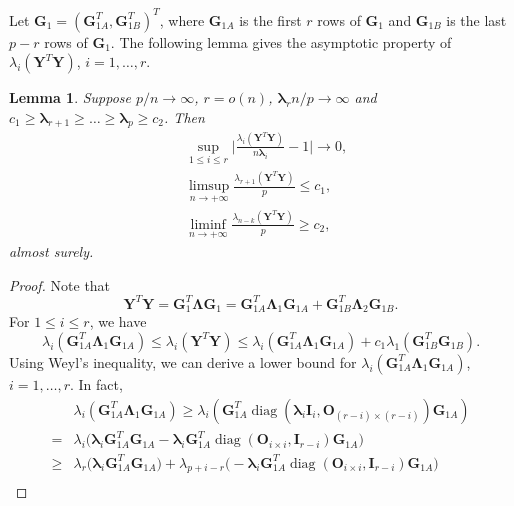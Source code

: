 \documentclass[12pt]{article} %
\DeclareMathOperator{\mydiag}{diag}
\newcommand{\bA}{\mathbf{A}}
\newcommand{\bY}{\mathbf{Y}}
\newcommand{\bG}{\mathbf{G}}
\newcommand{\bO}{\mathbf{O}}
\newcommand{\bI}{\mathbf{I}}
\newcommand{\bD}{\mathbf{D}}
\newcommand{\bV}{\mathbf{V}}
\newcommand{\bfsym}[1]{\ensuremath{\boldsymbol{#1}}}
\def\blambda {\bfsym {\lambda}}
\def\bLambda {\bfsym {\Lambda}}
\newtheorem{lemma}{Lemma}
\theoremstyle{definition}
\begin{document}
\begin{appendices}
Let $\bG_1=(\bG_{1A}^T,\bG_{1B}^T)^T$, where $\bG_{1A}$ is the first $r$ rows of $\bG_1$ and $\bG_{1B}$ is the last $p-r$ rows of $\bG_1$.
The following lemma gives the asymptotic property of $\lambda_{i}(\bY^T \bY)$, $i=1,\ldots, r$.
\begin{lemma}\label{PCAlemma1}
    Suppose $p/n\to \infty$, $r=o(n)$, $\blambda_r n/p\to \infty$ and $c_1\geq\blambda_{r+1}\geq \ldots \geq \blambda_p\geq c_2$. 
    Then
    \begin{align}
        &\sup_{1\leq i\leq r}\Big|\frac{\lambda_{i}(\bY^T \bY)}{n\blambda_i}-1\Big|\to 0,\label{PCAlemma1:eq1}\\
        &\limsup_{n\to +\infty}\frac{\lambda_{r+1}(\bY^T\bY)}{p}\leq c_1,\label{PCAlemma1:eq2}\\
        &\liminf_{n\to +\infty}\frac{\lambda_{n-k}(\bY^T\bY)}{p}\geq c_2,\label{PCAlemma1:eq3}
    \quad
    \end{align}
    almost surely.
\end{lemma}
\begin{proof}
    Note that
$$
\bY^T \bY =\bG_1^T \bLambda \bG_1
=
\bG_{1A}^T \bLambda_1 \bG_{1A}+
\bG_{1B}^T \bLambda_2 \bG_{1B}.
$$
For $1\leq i \leq r$, we have
    \begin{equation}\label{eq:DLU}
\lambda_i(\bG_{1A}^T \bLambda_1 \bG_{1A})
    \leq \lambda_i(\bY^T \bY) \leq \lambda_i(\bG_{1A}^T \bLambda_1 \bG_{1A})+
    c_1 \lambda_1(\bG_{1B}^T  \bG_{1B}).
    \end{equation}
 Using Weyl's inequality, we can derive a lower bound for $\lambda_i(\bG_{1A}^T \bLambda_1 \bG_{1A})$, $ i=1,\ldots, r$. In fact,
\begin{equation}\label{eq:DLower}
\begin{aligned}
&\lambda_i(\bG_{1A}^T \bLambda_1 \bG_{1A})
\geq
\lambda_i(\bG_{1A}^T \mydiag(\blambda_i \bI_{i},\bO_{(r-i)\times(r-i)}) \bG_{1A})
\\
    =&
    \lambda_i\Big( \blambda_i \bG_{1A}^T \bG_{1A}-\blambda_i\bG_{1A}^T \mydiag(\bO_{i\times i}, \bI_{r-i}) \bG_{1A}\Big)\\
    \geq&
    \lambda_r\Big( \blambda_i \bG_{1A}^T \bG_{1A}\Big)+\lambda_{p+i-r}\Big(-\blambda_i\bG_{1A}^T \mydiag(\bO_{i\times i}, \bI_{r-i}) \bG_{1A}\Big)\\

\end{aligned}
\end{equation}
\end{proof}
\end{appendices}
\end{document}
